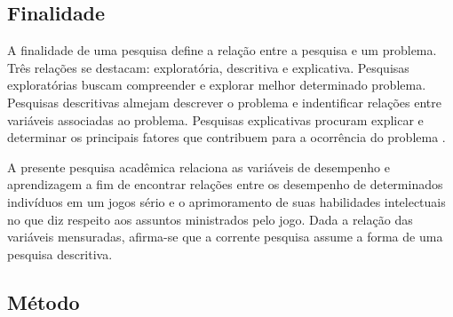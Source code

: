 


\subsection{Finalidade}\label{sub:finalidade}



A  finalidade de uma pesquisa define a relação entre a pesquisa e um problema. Três relações se destacam: exploratória, descritiva e explicativa. Pesquisas exploratórias buscam compreender e explorar melhor determinado problema. Pesquisas descritivas almejam descrever o problema e indentificar relações entre variáveis associadas ao problema. Pesquisas explicativas procuram explicar e determinar os principais fatores que contribuem para a ocorrência do problema \cite{trivinos2009introduccao}. 

A presente pesquisa acadêmica relaciona as variáveis de desempenho e aprendizagem a fim de encontrar relações entre os desempenho de determinados indivíduos em um jogos sério e o aprimoramento de suas habilidades intelectuais no que diz respeito aos assuntos ministrados pelo jogo. Dada a relação das variáveis mensuradas, afirma-se que a corrente pesquisa assume a forma de uma pesquisa descritiva. 








\subsection{Método}\label{sub:metodo}




